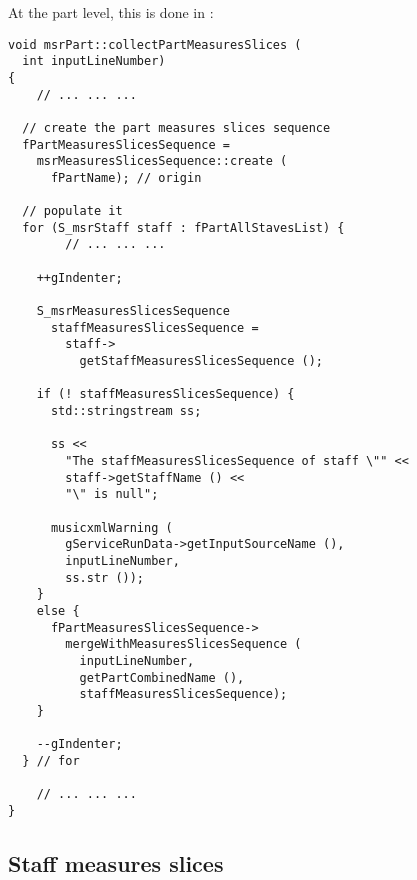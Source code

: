 At the part level, this is done in :
\begin{lstlisting}[language=CPlusPlus]
void msrPart::collectPartMeasuresSlices (
  int inputLineNumber)
{
	// ... ... ...

  // create the part measures slices sequence
  fPartMeasuresSlicesSequence =
    msrMeasuresSlicesSequence::create (
      fPartName); // origin

  // populate it
  for (S_msrStaff staff : fPartAllStavesList) {
		// ... ... ...

    ++gIndenter;

    S_msrMeasuresSlicesSequence
      staffMeasuresSlicesSequence =
        staff->
          getStaffMeasuresSlicesSequence ();

    if (! staffMeasuresSlicesSequence) {
      std::stringstream ss;

      ss <<
        "The staffMeasuresSlicesSequence of staff \"" <<
        staff->getStaffName () <<
        "\" is null";

      musicxmlWarning (
        gServiceRunData->getInputSourceName (),
        inputLineNumber,
        ss.str ());
    }
    else {
      fPartMeasuresSlicesSequence->
        mergeWithMeasuresSlicesSequence (
          inputLineNumber,
          getPartCombinedName (),
          staffMeasuresSlicesSequence);
    }

    --gIndenter;
  } // for

	// ... ... ...
}
\end{lstlisting}


\subsection{Staff measures slices}

